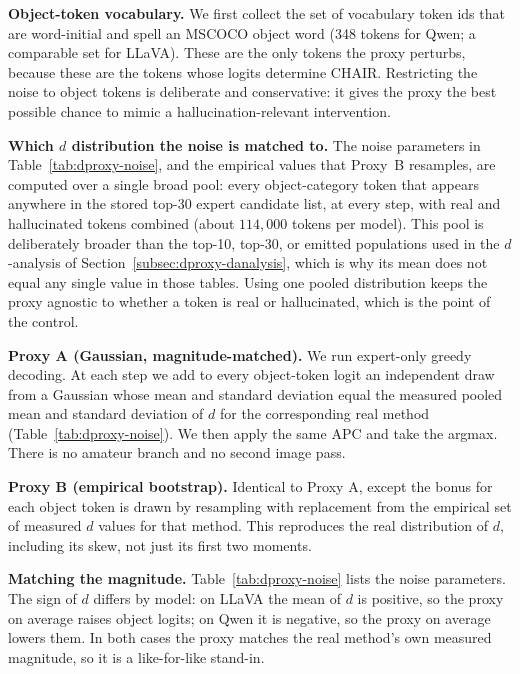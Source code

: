 \textbf{Object-token vocabulary.} We first collect the set of vocabulary token
ids that are word-initial and spell an MSCOCO object word (348 tokens for
Qwen; a comparable set for LLaVA). These are the only tokens the proxy perturbs,
because these are the tokens whose logits determine CHAIR. Restricting the noise
to object tokens is deliberate and conservative: it gives the proxy the best
possible chance to mimic a hallucination-relevant intervention.

\textbf{Which $d$ distribution the noise is matched to.} The noise parameters in
Table~\ref{tab:dproxy-noise}, and the empirical values that Proxy~B resamples, are
computed over a single broad pool: every object-category token that appears
anywhere in the stored top-30 expert candidate list, at every step, with real and
hallucinated tokens combined (about $114{,}000$ tokens per model). This pool is
deliberately broader than the top-10, top-30, or emitted populations used in the
$d$-analysis of Section~\ref{subsec:dproxy-danalysis}, which is why its mean does
not equal any single value in those tables. Using one pooled distribution keeps
the proxy agnostic to whether a token is real or hallucinated, which is the point
of the control.

\textbf{Proxy A (Gaussian, magnitude-matched).} We run expert-only greedy
decoding. At each step we add to every object-token logit an independent draw
from a Gaussian whose mean and standard deviation equal the measured pooled mean
and standard deviation of $d$ for the corresponding real method
(Table~\ref{tab:dproxy-noise}). We then apply the same APC and take the argmax.
There is no amateur branch and no second image pass.

\textbf{Proxy B (empirical bootstrap).} Identical to Proxy A, except the bonus
for each object token is drawn by resampling with replacement from the empirical
set of measured $d$ values for that method. This reproduces the real
distribution of $d$, including its skew, not just its first two moments.

\textbf{Matching the magnitude.} Table~\ref{tab:dproxy-noise} lists the noise
parameters. The sign of $d$ differs by model: on LLaVA the mean of $d$ is
positive, so the proxy on average raises object logits; on Qwen it is negative,
so the proxy on average lowers them. In both cases the proxy matches the real
method's own measured magnitude, so it is a like-for-like stand-in.

